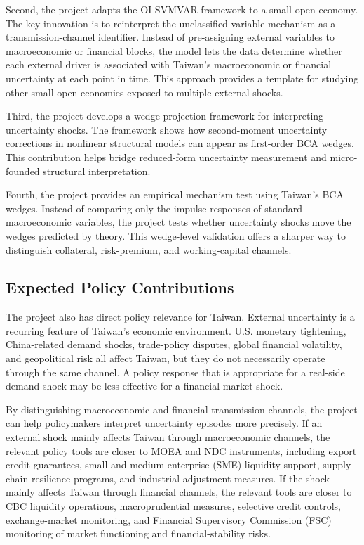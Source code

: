 \documentclass[12pt]{article}
\begin{document}
Second, the project adapts the OI-SVMVAR framework to a small open economy. The key
innovation is to reinterpret the unclassified-variable mechanism as a transmission-channel
identifier. Instead of pre-assigning external variables to macroeconomic or financial blocks, the
model lets the data determine whether each external driver is associated with Taiwan's
macroeconomic or financial uncertainty at each point in time. This approach provides a template
for studying other small open economies exposed to multiple external shocks.

Third, the project develops a wedge-projection framework for interpreting uncertainty shocks.
The framework shows how second-moment uncertainty corrections in nonlinear structural models
can appear as first-order BCA wedges. This contribution helps bridge reduced-form uncertainty
measurement and micro-founded structural interpretation.

Fourth, the project provides an empirical mechanism test using Taiwan's BCA wedges. Instead
of comparing only the impulse responses of standard macroeconomic variables, the project tests
whether uncertainty shocks move the wedges predicted by theory. This wedge-level validation
offers a sharper way to distinguish collateral, risk-premium, and working-capital channels.

\subsection{Expected Policy Contributions}

The project also has direct policy relevance for Taiwan. External uncertainty is a recurring feature
of Taiwan's economic environment. U.S. monetary tightening, China-related demand shocks,
trade-policy disputes, global financial volatility, and geopolitical risk all affect Taiwan, but they
do not necessarily operate through the same channel. A policy response that is appropriate for a
real-side demand shock may be less effective for a financial-market shock.

By distinguishing macroeconomic and financial transmission channels, the project can help
policymakers interpret uncertainty episodes more precisely. If an external shock mainly affects
Taiwan through macroeconomic channels, the relevant policy tools are closer to MOEA and NDC
instruments, including export credit guarantees, small and medium enterprise (SME) liquidity
support, supply-chain resilience programs, and industrial adjustment measures. If the shock
mainly affects Taiwan through financial channels, the relevant tools are closer to CBC liquidity
operations, macroprudential measures, selective credit controls, exchange-market monitoring,
and Financial Supervisory Commission (FSC) monitoring of market functioning and
financial-stability risks.
\end{document}
